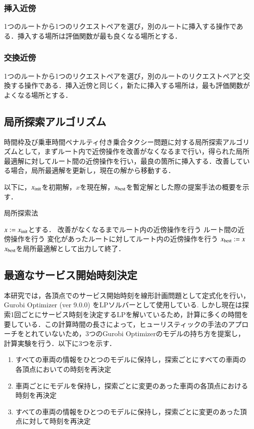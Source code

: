 \documentclass[a4j,11pt,twocolumn]{jsarticle}
\begin{document}
\subsubsection{挿入近傍}
1つのルートから1つのリクエストペアを選び，別のルートに挿入する操作である．挿入する場所は評価関数が最も良くなる場所とする．
\subsubsection{交換近傍}
1つのルートから1つのリクエストペアを選び，別のルートのリクエストペアと交換する操作である．挿入近傍と同じく，新たに挿入する場所は，最も評価関数がよくなる場所とする．
\subsection{{\large 局所探索アルゴリズム}}
時間枠及び乗車時間ペナルティ付き乗合タクシー問題に対する局所探索アルゴリズムとして，まずルート内で近傍操作を改善がなくなるまで行い，得られた局所最適解に対してルート間の近傍操作を行い，最良の箇所に挿入する．改善している場合，局所最適解を更新し，現在の解から移動する．

以下に，$x_{\rm init}$を初期解，$x$を現在解，$x_{\rm best}$を暫定解とした際の提案手法の概要を示す．
\begin{algorithm}
 \caption{局所探索法}
 \label{algo1}
 \begin{algorithmic}[1]%
  \STATE $x := x_{\rm init}$とする．
  \STATE 改善がなくなるまでルート内の近傍操作を行う
  \STATE ルート間の近傍操作を行う
  \STATE 変化があったルートに対してルート内の近傍操作を行う
  \STATE  $x_{\rm best} := x$
  \ENDIF
  \STATE $x_{\rm best}$を局所最適解として出力して終了．
 \end{algorithmic}
\end{algorithm}

\subsection{{\large 最適なサービス開始時刻決定}}
本研究では，各頂点でのサービス開始時刻を線形計画問題として定式化を行い，Gurobi Optimizer (ver 9.0.0) をLPソルバーとして使用している.
しかし現在は探索1回ごとにサービス時刻を決定するLPを解いているため，計算に多くの時間を要している．この計算時間の長さによって，ヒューリスティックの手法のアプローチをとれていないため，3つのGurobi Optimizerのモデルの持ち方を提案し，計算実験を行う．以下に3つを示す．

\begin{enumerate}
  \item すべての車両の情報をひとつのモデルに保持し，探索ごとにすべての車両の各頂点においての時刻を再決定
  \item 車両ごとにモデルを保持し，探索ごとに変更のあった車両の各頂点における時刻を再決定
  \item すべての車両の情報をひとつのモデルに保持し，探索ごとに変更のあった頂点に対して時刻を再決定
\end{enumerate}
\end{document}
